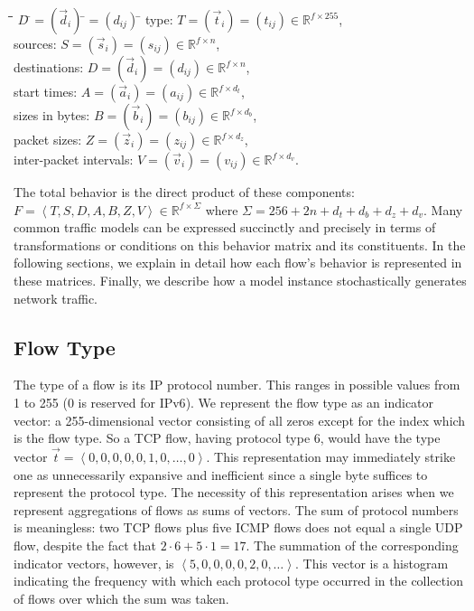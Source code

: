 \documentclass[twocolumn,final]{svjour3}
\newcommand{\caps}[1]{{\small{#1}}}
\newcommand{\R}{\mathbb{R}}
\newcommand{\parensx}[1]{(#1)}
\newcommand{\seq}[1]{\left<#1\right>}
\renewcommand{\bullet}{\raisebox{2pt}{$\centerdot$}}
\begin{document}
\begin{tabbing}
\hspace{1em}\=\bullet\hspace{0.5em}\=\hspace{9.75em}\=
$D\:$\=$=\parensx{\vec{d}_i}\:$\=$=\parensx{d_{ij}}\:$\=\kill
\>\bullet\> type: \>$T$\>$=\parensx{\vec{t}_i}$\>$=\parensx{t_{ij}}$\>$\in\R^{f \times 255}$,\\
\>\bullet\> sources: \>$S$\>$=\parensx{\vec{s}_i}$\>$=\parensx{s_{ij}}$\>$\in\R^{f \times n}$,\\
\>\bullet\> destinations: \>$D$\>$=\parensx{\vec{d}_i}$\>$=\parensx{d_{ij}}$\>$\in\R^{f \times n}$,\\
\>\bullet\> start times: \>$A$\>$=\parensx{\vec{a}_i}$\>$=\parensx{a_{ij}}$\>$\in\R^{f \times d_t}$,\\
\>\bullet\> sizes in bytes: \>$B$\>$=\parensx{\vec{b}_i}$\>$=\parensx{b_{ij}}$\>$\in\R^{f \times d_b}$,\\
\>\bullet\> packet sizes: \>$Z$\>$=\parensx{\vec{z}_i}$\>$=\parensx{z_{ij}}$\>$\in\R^{f \times d_z}$,\\
\>\bullet\> inter-packet intervals: \>$V$\>$=\parensx{\vec{v}_i}$\>$=\parensx{v_{ij}}$\>$\in\R^{f \times d_v}$.
\end{tabbing}
The total behavior is the direct product of these components: $F = \seq{T,S,D,A,B,Z,V} \in \R^{f \times \Sigma}$ where $\Sigma=256+2n+d_t+d_b+d_z+d_v$. Many common traffic models can be expressed succinctly and precisely in terms of transformations or conditions on this behavior matrix and its constituents. In the following sections, we explain in detail how each flow's behavior is represented in these matrices. Finally, we describe how a model instance stochastically generates network traffic.

\subsection{Flow Type}

The type of a flow is its \caps{IP} protocol number. This ranges in possible values from 1 to 255 (0 is reserved for \caps{IPv6}). We represent the flow type as an indicator vector: a 255-dimensional vector consisting of all zeros except for the index which is the flow type. So a \caps{TCP} flow, having protocol type 6, would have the type vector $\vec{t}=\seq{0,0,0,0,0,1,0,\dots,0}$. This representation may immediately strike one as unnecessarily expansive and inefficient since a single byte suffices to represent the protocol type. The necessity of this representation arises when we represent aggregations of flows as sums of vectors. The sum of protocol numbers is meaningless: two \caps{TCP} flows plus five \caps{ICMP} flows does not equal a single \caps{UDP} flow, despite the fact that $2\cdot6+5\cdot1=17$. The summation of the corresponding indicator vectors, however, is $\seq{5,0,0,0,0,2,0,\dots}$. This vector is a histogram indicating the frequency with which each protocol type occurred in the collection of flows over which the sum was taken.
\end{document}
